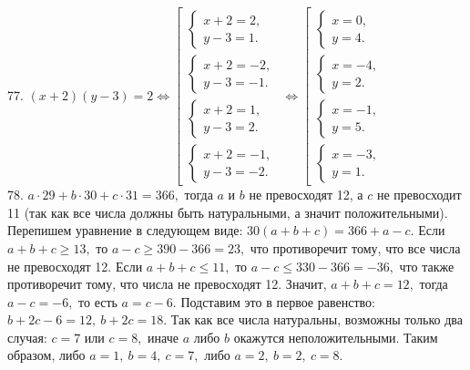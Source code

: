\documentclass[12pt]{article}
\begin{document}
77. $(x+2)(y-3)=2\Leftrightarrow \left[\begin{array}{l}\begin{cases}x+2=2,\\ y-3=1.\end{cases}\\ \begin{cases}x+2=-2,\\ y-3=-1.\end{cases}\\
\begin{cases}x+2=1,\\ y-3=2.\end{cases}\\ \begin{cases}x+2=-1,\\ y-3=-2.\end{cases}\end{array}\right.\Leftrightarrow
\left[\begin{array}{l}\begin{cases}x=0,\\ y=4.\end{cases}\\ \begin{cases} x=-4,\\ y=2.\end{cases}\\
\begin{cases}x=-1,\\ y=5.\end{cases}\\ \begin{cases}x=-3,\\ y=1.\end{cases}\end{array}\right.$\\
78. $a\cdot29+b\cdot30+c\cdot31=366,$ тогда $a$ и $b$ не превосходят 12, а $c$ не превосходит 11 (так как все числа должны быть натуральными, а значит положительными). Перепишем уравнение в следующем виде: $30(a+b+c)=366+a-c.$ Если $a+b+c\geqslant 13,$ то $a-c\geqslant390-366=23,$ что противоречит тому, что все числа не превосходят 12. Если $a+b+c\leqslant 11,$ то $a-c\leqslant 330-366=-36,$ что также противоречит тому, что числа не превосходят 12. Значит, $a+b+c=12,$ тогда $a-c=-6,$ то есть $a=c-6.$ Подставим это в первое равенство: $b+2c-6=12,\ b+2c=18.$ Так как все числа натуральны, возможны только два случая: $c=7$ или $c=8,$ иначе $a$ либо $b$ окажутся неположительными. Таким образом, либо $a=1,\ b=4,\ c=7,$ либо $a=2,\ b=2,\ c=8.$\\
\end{document}
